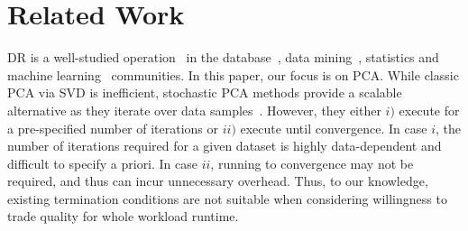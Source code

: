 \section{Related Work}
\label{sec:relwork}
\label{sec:relatedwork}

 DR is a well-studied operation~\cite{dr-survey1,dr-survey2,nonlinear-dr} in the
database~\cite{keogh-indexing,local-dr,charu-ss}, data
mining~\cite{sax,paa}, statistics and machine
learning~\cite{alecton,shamir,bernstein,pca-stoc} communities.
In this paper, our focus is on PCA.
While classic PCA via SVD is inefficient, stochastic PCA methods provide a scalable alternative as they iterate over data samples~\cite{re-new, shamir}.
However, they either $i)$ execute for a pre-specified number of iterations or $ii)$ execute until convergence.
In case $i$, the number of iterations required for a given dataset is highly data-dependent and difficult to specify a priori.
In case $ii$, running to convergence may not be required, and thus can incur unnecessary overhead.
Thus, to our knowledge, existing termination conditions are not suitable when considering willingness to trade quality for whole workload runtime.






